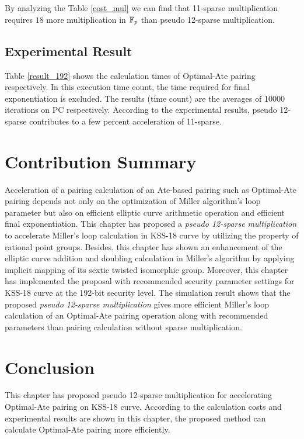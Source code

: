 By analyzing the Table \ref{cost_mul} we can find that  11-sparse multiplication requires $18$ more multiplication in ${\mathbb{F}}_{p}$ than pseudo 12-sparse multiplication.
\subsection{Experimental Result}
Table \ref{result_192} shows the calculation times of Optimal-Ate pairing respectively. In this execution time count, the time required for final exponentiation is excluded. The results (time count) are the averages of 10000 iterations on PC respectively. According to the experimental results, pseudo 12-sparse contributes to a few percent acceleration of 11-sparse.
\renewcommand{\baselinestretch}{1.5}
\begin{table}[ht]
	\begin{center}
		\caption{Calculation time of Optimal-Ate pairing at the 192-bit security level.}
		\label{result_192}
	\end{center}
\end{table}
\renewcommand{\baselinestretch}{1.0}

\section{Contribution Summary}
Acceleration of a pairing calculation of an Ate-based pairing such as Optimal-Ate pairing depends not only on the optimization of Miller algorithm's loop parameter but also on efficient elliptic curve arithmetic operation and efficient final exponentiation. 
This chapter has proposed a \textit{pseudo 12-sparse multiplication} to accelerate Miller's loop calculation in KSS-18 curve by utilizing the property of rational point groups.
Besides, this chapter has shown an enhancement of the elliptic curve addition and doubling calculation in Miller's algorithm by applying implicit mapping of its sextic twisted isomorphic group. 
Moreover, this chapter has implemented the proposal with recommended security parameter settings for KSS-18 curve at the 192-bit security level.
The simulation result shows that the proposed \textit{pseudo 12-sparse multiplication} gives more efficient Miller's loop calculation of an Optimal-Ate pairing operation along with recommended parameters than pairing calculation without sparse multiplication.

\section{Conclusion}
This chapter has proposed pseudo 12-sparse multiplication for accelerating Optimal-Ate pairing on KSS-18 curve. 
According to the calculation costs and experimental results are shown in this chapter, the proposed method can calculate Optimal-Ate pairing more efficiently. 